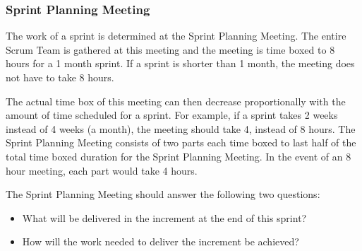 \subsubsection{Sprint Planning Meeting}


The work of a sprint is determined at the Sprint Planning Meeting. The entire Scrum Team is gathered at this meeting and the meeting is time boxed to 8 hours for a 1 month sprint. If a sprint is shorter than 1 month, the meeting does not have to take 8 hours\cite{scrumguide11}. 


The actual time box of this meeting can then decrease proportionally with the amount of time scheduled for a sprint. For example, if a sprint takes 2 weeks instead of 4 weeks (a month), the meeting should take 4, instead of 8 hours\cite{scrumguide11}.  The Sprint Planning Meeting consists of two parts each time boxed to last half of the total time boxed duration for the Sprint Planning Meeting. In the event of an 8 hour meeting, each part would take 4 hours\cite{scrumguide11}.


The Sprint Planning Meeting should answer the following two questions\cite{scrumguide11}:

\begin{itemize}
	\item What will be delivered in the increment at the end of this sprint?
	\item	How will the work needed to deliver the increment be achieved?
\end{itemize}



